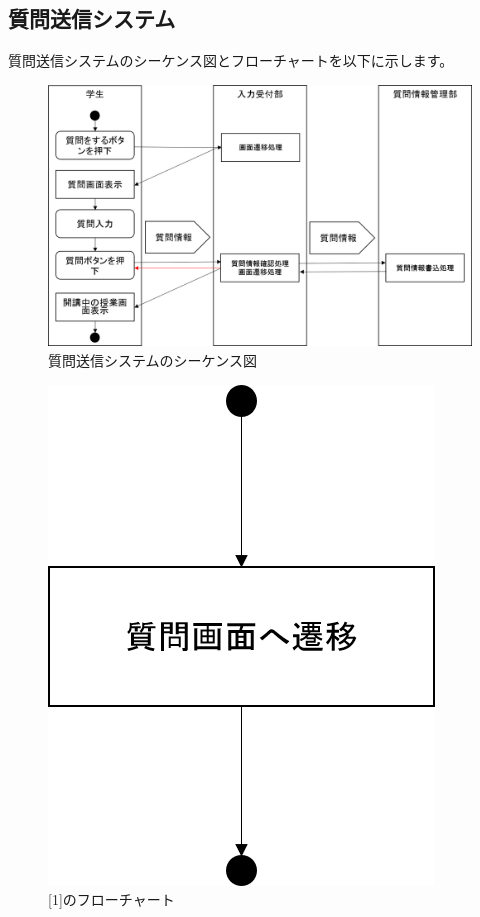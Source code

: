 \newpage
\subsection{質問送信システム}
質問送信システムのシーケンス図とフローチャートを以下に示します。

\begin{figure}[htbp]
  \begin{center}
    \includegraphics[width=1\linewidth,clip]{./img/q_send/main.png}
    \caption{質問送信システムのシーケンス図}\label{fig:qsendseaquence}
  \end{center}
\end{figure}

\begin{figure}[htbp]
  \begin{center}
    \includegraphics[width=0.3\linewidth,clip]{./img/q_send/sub1.png}
    \caption{[1]のフローチャート}\label{fig:qsendflow0}
  \end{center}
\end{figure}

